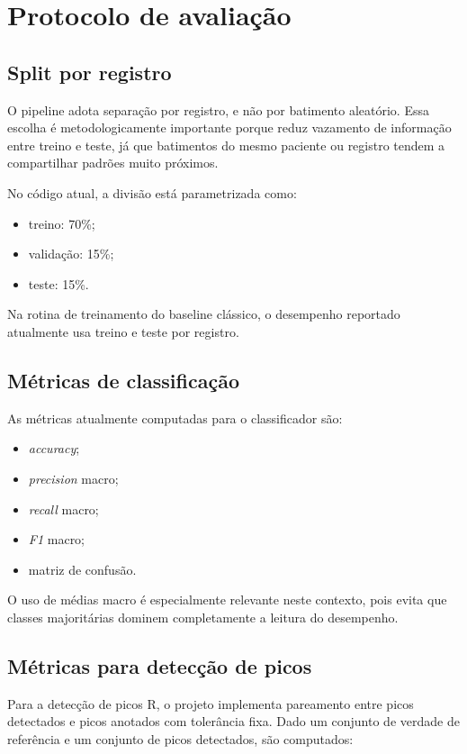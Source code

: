 \documentclass[12pt,a4paper]{article}
\begin{document}
\section{Protocolo de avalia\c{c}\~ao}
\subsection{Split por registro}
O pipeline adota separa\c{c}\~ao por registro, e n\~ao por batimento aleat\'orio. Essa escolha \'e metodologicamente importante porque reduz vazamento de informa\c{c}\~ao entre treino e teste, j\'a que batimentos do mesmo paciente ou registro tendem a compartilhar padr\~oes muito pr\'oximos.

No c\'odigo atual, a divis\~ao est\'a parametrizada como:

\begin{itemize}
    \item treino: 70\%;
    \item valida\c{c}\~ao: 15\%;
    \item teste: 15\%.
\end{itemize}

Na rotina de treinamento do baseline cl\'assico, o desempenho reportado atualmente usa treino e teste por registro.

\subsection{M\'etricas de classifica\c{c}\~ao}
As m\'etricas atualmente computadas para o classificador s\~ao:

\begin{itemize}
    \item \textit{accuracy};
    \item \textit{precision} macro;
    \item \textit{recall} macro;
    \item \textit{F1} macro;
    \item matriz de confus\~ao.
\end{itemize}

O uso de m\'edias macro \'e especialmente relevante neste contexto, pois evita que classes majorit\'arias dominem completamente a leitura do desempenho.

\subsection{M\'etricas para detec\c{c}\~ao de picos}
Para a detec\c{c}\~ao de picos R, o projeto implementa pareamento entre picos detectados e picos anotados com toler\^ancia fixa. Dado um conjunto de verdade de refer\^encia e um conjunto de picos detectados, s\~ao computados:
\end{document}

